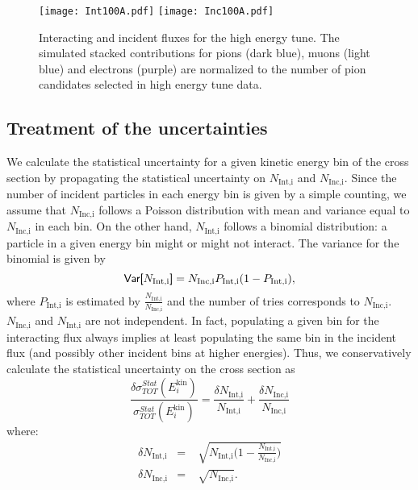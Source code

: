 \documentclass[%
 floatfix,
 reprint,
 twocolumn,
superscriptaddress,
showpacs,preprintnumbers,
 amsmath,amssymb,
 aps,
prd,
]{revtex4-1}
\begin{document}
\begin{figure}
\centering
\texttt{[image: Int100A.pdf]}
\texttt{[image: Inc100A.pdf]}
\caption{\label{fig:100AFlux}  Interacting and incident fluxes for the high energy tune. The simulated stacked contributions for pions (dark blue), muons (light blue) and electrons (purple) are normalized to the number of pion  candidates selected in high energy tune data. }
\end{figure}

\subsection{\label{sec:Corrections}Treatment of the uncertainties}
We calculate the statistical uncertainty for a given kinetic energy bin of the cross section by propagating the statistical uncertainty on $N_{\text{Int,i}}$ and $N_{\text{Inc,i}}$.  Since the number of incident particles in each energy bin is given by a simple counting, we assume that $N_{\text{Inc,i}}$ follows a Poisson distribution with mean and variance equal to $N_{\text{Inc,i}}$ in each bin.  
On the other hand, $N_{\text{Int,i}}$ follows a binomial distribution: a particle in a given energy bin might or might not interact.  The variance for the binomial is given by  
\begin{equation}
\text{\textsf{Var[}} N_{\text{Int,i}} \text{\textsf{]}}
 = N_{\text{Inc,i}}P_{\text{Int,i}}(1-P_{\text{Int,i}}),
\label{eq:binVar}
\end{equation}
where  $P_{\text{Int,i}}$ is estimated by $\frac{ N_{\text{Int,i}}}{N_{\text{Inc,i}}}$ and the number of tries corresponds to $N_{\text{Inc,i}}$. $N_{\text{Inc,i}}$ and $N_{\text{Int,i}}$ are not independent. In fact, populating a given bin for the interacting flux always implies at least populating the same bin in the incident flux  (and possibly other incident bins at higher energies). Thus, we conservatively calculate the statistical uncertainty on the cross section as 
\begin{equation}
\frac{\delta\sigma^{Stat}_{TOT}(E^\text{kin}_i)}{\sigma^{Stat}_{TOT}(E^\text{kin}_i)} =  \frac{\delta N_{\text{Int,i}}}{N_{\text{Int,i}}}+\frac{\delta N_{\text{Inc,i}}}{N_{\text{Inc,i}}}
\end{equation}
where:
\begin{eqnarray}
\delta N_{\text{Int,i}} &=& \sqrt[]{N_{\text{Int,i}}\Big(1-\frac{ N_{\text{Int,i}}}{N_{\text{Inc,i}}}\Big)}\\
\delta N_{\text{Inc,i}} &=& \sqrt[]{N_{\text{Inc,i}}} 
.
\end{eqnarray} 
\end{document}
